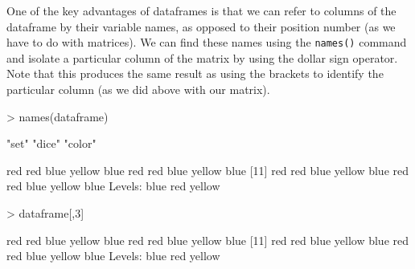 \documentclass[12pt]{article}
\begin{document}
One of the key advantages of dataframes is that we can refer to columns of the dataframe by their variable names, as opposed to their position number (as we have to do with matrices). We can find these names using the \verb|names()| command and isolate a particular column of the matrix by using the dollar sign operator. Note that this produces the same result as using the brackets to identify the particular column (as we did above with our matrix).
\begin{Schunk}
\begin{Sinput}
> names(dataframe)
\end{Sinput}
\begin{Soutput}
[1] "set"   "dice"  "color"
\end{Soutput}
\begin{Soutput}
 [1] red    red    blue   yellow blue   red    red    blue   yellow blue  
[11] red    red    blue   yellow blue   red    red    blue   yellow blue  
Levels: blue red yellow
\end{Soutput}
\begin{Sinput}
> dataframe[,3]
\end{Sinput}
\begin{Soutput}
 [1] red    red    blue   yellow blue   red    red    blue   yellow blue  
[11] red    red    blue   yellow blue   red    red    blue   yellow blue  
Levels: blue red yellow
\end{Soutput}
\end{Schunk}
\end{document}
